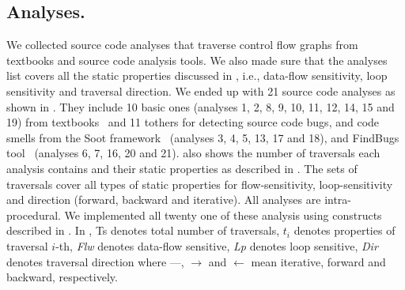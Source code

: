 \subsection{Analyses.} We collected source code analyses that traverse control flow 
graphs from textbooks and source code analysis tools. We also made sure that the 
analyses list covers all the static properties discussed in  
, i.e., data-flow sensitivity, loop sensitivity and 
traversal direction. We ended up with 21 source code analyses as shown in 
. They include 10 basic ones (analyses 1, 2, 8, 9, 
10, 11, 12, 14, 15 and 19) from textbooks~\cite{compilers, programanalysis} and 11 
tothers for detecting source code bugs, and code smells from the Soot 
framework~\cite{vallee1999soot} (analyses 3, 4, 5, 13, 17 and 18), and 
FindBugs tool~\cite{findbugs-paste2007} (analyses 6, 7, 16, 20 and 21). 
 also shows the number of traversals each analysis 
contains and their static properties as described in . 
The sets of traversals cover all types of static properties for 
flow-sensitivity, loop-sensitivity and direction (forward, backward and iterative).
All analyses are intra-procedural. We implemented all twenty one of these analysis using constructs described in . In , Ts denotes total number of traversals, $t_i$ denotes properties of traversal $i$-th, \emph{Flw} denotes data-flow sensitive, \emph{Lp} denotes loop sensitive,
\emph{Dir} denotes traversal direction where ---, $\rightarrow$ and $\leftarrow$ 
mean iterative, forward and backward, respectively.





